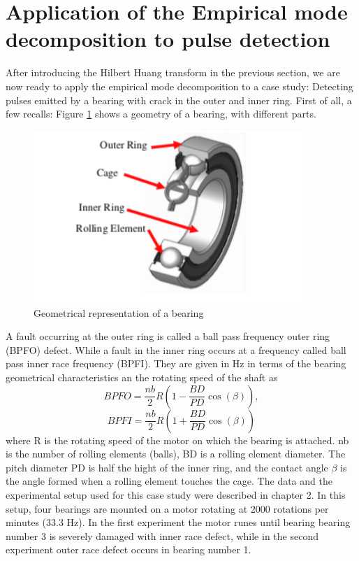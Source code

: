 \documentclass[../Main/thesis.tex]{subfiles}
\begin{document}
\section{Application of the Empirical mode decomposition to pulse detection}
\label{sec:pulse}
After introducing the Hilbert Huang transform in the previous section, we are now ready to apply the empirical mode decomposition to a case study: Detecting pulses emitted by a bearing with crack in the outer and inner ring. First of all, a few recalls: Figure \ref{fig:bearing-architecture} shows a geometry of a bearing, with different parts.
\begin{figure}[H] %
   \centering
   \includegraphics[width=4in]{../fig/bearing.png} 
   \caption{Geometrical representation of a bearing}
   \label{fig:bearing-architecture}
\end{figure}
\justify
A fault occurring at the outer ring is called a ball pass frequency outer ring (BPFO) defect. While a fault in the inner ring occurs at a frequency called ball pass inner race frequency (BPFI). They are given in Hz in terms of the bearing geometrical characteristics an the rotating speed of the shaft as
\begin{equation}\label{eq:bpfo2}
BPFO = \frac{nb}{2}R\left(1-\frac{BD}{PD}\cos\left(\beta\right)  \right) \nonumber,
\end{equation}
\begin{equation}\label{eq:bpfi2}
BPFI = \frac{nb}{2}R\left( 1 +  \frac{BD}{PD}\cos\left(\beta\right)   \right)
\end{equation}
where R is the rotating speed of the motor on which the bearing is attached. nb is the number of rolling elements (balls), BD is a rolling element diameter. The pitch diameter PD is half the hight of the inner ring, and the contact angle $\beta$ is the angle formed when a rolling element touches the cage. 
\justify
The data and the experimental setup used for this case study were described in chapter 2. In this setup, four bearings are mounted on a motor rotating at 2000 rotations per minutes (33.3 Hz). In the first experiment the motor runes until bearing
bearing number 3 is severely damaged with inner race defect, while in the second experiment outer race defect occurs in bearing number 1.
\end{document}
